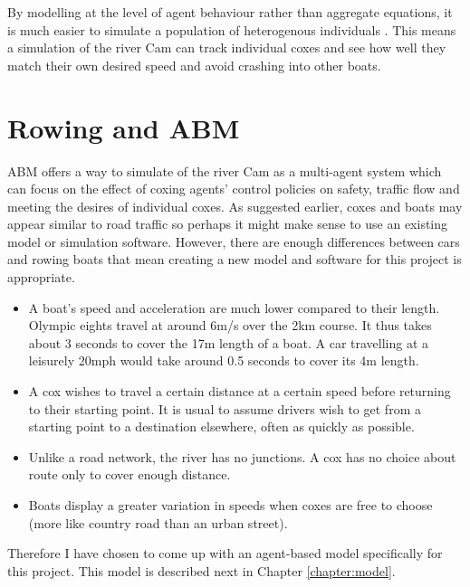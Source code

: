     By modelling at the level of agent behaviour rather than aggregate equations, it is much easier to simulate a population of heterogenous individuals \cite{Bonabeau2002}. This means a simulation of the river Cam can track individual coxes and see how well they match their own desired speed and avoid crashing into other boats.
    
    \section{Rowing and ABM}
    ABM offers a way to simulate of the river Cam as a multi-agent system which can focus on the effect of coxing agents' control policies on safety, traffic flow and meeting the desires of individual coxes. As suggested earlier, coxes and boats may appear similar to road traffic so perhaps it might make sense to use an existing model or simulation software. However, there are enough differences between cars and rowing boats that mean creating a new model and software for this project is appropriate.
    
      \begin{itemize}
        \item A boat's speed and acceleration are much lower compared to their length. Olympic eights travel at around 6m/s over the 2km course. It thus takes about 3 seconds to cover the 17m length of a boat. A car travelling at a leisurely 20mph would take around 0.5 seconds to cover its 4m length.
        
        \item A cox wishes to travel a certain distance at a certain speed before returning to their starting point. It is usual to assume drivers wish to get from a starting point to a destination elsewhere, often as quickly as possible. 
        
        \item Unlike a road network, the river has no junctions. A cox has no choice about route only to cover enough distance.
        
        \item Boats display a greater variation in speeds when coxes are free to choose (more like country road than an urban street).
      \end{itemize}

  Therefore I have chosen to come up with an agent-based model specifically for this project. This model is described next in Chapter \ref{chapter:model}.
  